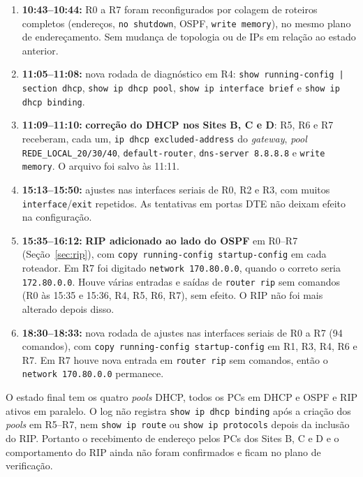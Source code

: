 \documentclass[12pt,a4paper]{article}
\begin{document}
\begin{enumerate}
\item \textbf{10:43--10:44:} R0 a R7 foram reconfigurados por colagem de roteiros completos (endereços, \texttt{no shutdown}, OSPF, \texttt{write memory}), no mesmo plano de endereçamento. Sem mudança de topologia ou de IPs em relação ao estado anterior.
\item \textbf{11:05--11:08:} nova rodada de diagnóstico em R4: \texttt{show running-config | section dhcp}, \texttt{show ip dhcp pool}, \texttt{show ip interface brief} e \texttt{show ip dhcp binding}.
\item \textbf{11:09--11:10:} \textbf{correção do DHCP nos Sites B, C e D}: R5, R6 e R7 receberam, cada um, \texttt{ip dhcp excluded-address} do \textit{gateway}, \textit{pool} \texttt{REDE\_LOCAL\_20/30/40}, \texttt{default-router}, \texttt{dns-server 8.8.8.8} e \texttt{write memory}. O arquivo foi salvo às 11:11.
\item \textbf{15:13--15:50:} ajustes nas interfaces seriais de R0, R2 e R3, com muitos \texttt{interface}/\texttt{exit} repetidos. As tentativas em portas DTE não deixam efeito na configuração.
\item \textbf{15:35--16:12:} \textbf{RIP adicionado ao lado do OSPF} em R0--R7 (Seção~\ref{sec:rip}), com \texttt{copy running-config startup-config} em cada roteador. Em R7 foi digitado \texttt{network 170.80.0.0}, quando o correto seria \texttt{172.80.0.0}. Houve várias entradas e saídas de \texttt{router rip} sem comandos (R0 às 15:35 e 15:36, R4, R5, R6, R7), sem efeito. O RIP não foi mais alterado depois disso.
\item \textbf{18:30--18:33:} nova rodada de ajustes nas interfaces seriais de R0 a R7 (94 comandos), com \texttt{copy running-config startup-config} em R1, R3, R4, R6 e R7. Em R7 houve nova entrada em \texttt{router rip} sem comandos, então o \texttt{network 170.80.0.0} permanece.
\end{enumerate}
O estado final tem os quatro \textit{pools} DHCP, todos os PCs em DHCP e OSPF e RIP ativos em paralelo. O log não registra \texttt{show ip dhcp binding} após a criação dos \textit{pools} em R5--R7, nem \texttt{show ip route} ou \texttt{show ip protocols} depois da inclusão do RIP. Portanto o recebimento de endereço pelos PCs dos Sites B, C e D e o comportamento do RIP ainda não foram confirmados e ficam no plano de verificação.

\end{document}
